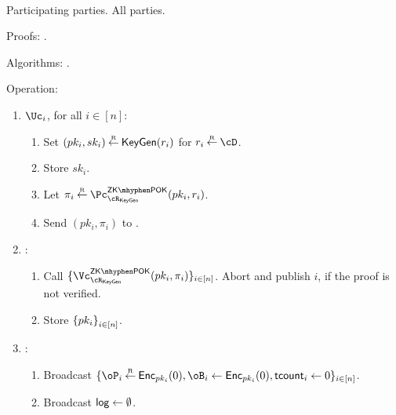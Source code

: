 \begin{protocol}~\label{prot:ConfidentialTransactions:Init}
	

	\item[Participating parties.] All parties.
			
			
	\item[Proofs:]   \piZKPOK{\rKeyGen}. 
	
	
	\item[Algorithms:]    \KeyGen.
	
			
\item[Operation:] ~
			
			
			\begin{enumerate}
				
				\item   $\Uc_i$, for  all $i\in [n]$:
				\begin{enumerate}
					\item Set $(pk_i,sk_i) \mathbin{\stackrel{\mbox{\tiny R}}{\leftarrow}} \mathsf{KeyGen}(r_i)$ for $r_i \getsr \cD$.
					
					\item Store $sk_i$.
					
					\item Let $\pi_i \getsr \pZKPOK{\rKeyGen}(pk_i,r_i)$.
					
					\item Send $(pk_i,\pi_i)$ to \Cc.
					
					
				\end{enumerate}
				
				\item \Cc:
				\begin{enumerate}
					
					\item Call $\sset{ \vZKPOK{\rKeyGen}(pk_i,\pi_i)}_{i\in [n]}$. Abort and publish $i$, if the \ith  proof is not verified. 
										
					\item Store $\set{pk_i}_{i\in [n]}$.
				\end{enumerate}
				
				
				\item \Cc: 
				\begin{enumerate}
					\item 	Broadcast $\sset{\oP_i\getsr \Enc_{pk_i}(0),\oB_i\asn \Enc_{pk_i}(0),\tcount_i 
					\asn 0}_{i\in [n]}$.
					
					\item    Broadcast $\mathsf{log} \leftarrow \emptyset$.
				\end{enumerate}								
			\end{enumerate}
\end{protocol}

